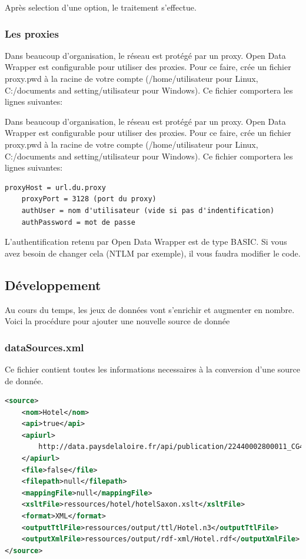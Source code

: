 \documentclass[a4paper]{article}
\begin{document}
Après selection d'une option, le traitement s'effectue.

\subsubsection{Les proxies}

Dans beaucoup d'organisation, le réseau est protégé par un proxy. Open Data
Wrapper est configurable pour utiliser des proxies. Pour ce faire, crée un
fichier proxy.pwd à la racine de votre compte (/home/utilisateur pour Linux,
C:/documents and setting/utilisateur pour Windows). Ce fichier comportera les
lignes suivantes:

Dans beaucoup d'organisation, le réseau est protégé par un proxy. Open Data
Wrapper est configurable pour utiliser des proxies. Pour ce faire, crée un
fichier proxy.pwd à la racine de votre compte (/home/utilisateur pour Linux,
C:/documents and setting/utilisateur pour Windows). Ce fichier comportera les
lignes suivantes:

\begin{lstlisting}[caption=Fichier de configuration des proxys proxy.pwd]
	proxyHost = url.du.proxy
	proxyPort = 3128 (port du proxy)
	authUser = nom d'utilisateur (vide si pas d'indentification)
	authPassword = mot de passe
\end{lstlisting}

L'authentification retenu par Open Data Wrapper est de type BASIC. Si vous avez
besoin de changer cela (NTLM par exemple), il vous faudra modifier le code.

\subsection{Développement}

Au cours du temps, les jeux de données vont s'enrichir et augmenter en nombre.
Voici la procédure pour ajouter une nouvelle source de donnée

\subsubsection{dataSources.xml}

Ce fichier contient toutes les informations necessaires à la conversion d'une
source de donnée.

\begin{lstlisting}[caption=Extrait de dataSources.xml, language=XML]
<source>
	<nom>Hotel</nom>
	<api>true</api>
	<apiurl>
		http://data.paysdelaloire.fr/api/publication/22440002800011_CG44_TOU_04815/hotels_STBL/content?format=xml
	</apiurl>
	<file>false</file>
	<filepath>null</filepath>
	<mappingFile>null</mappingFile>
	<xsltFile>ressources/hotel/hotelSaxon.xslt</xsltFile>
	<format>XML</format>
	<outputTtlFile>ressources/output/ttl/Hotel.n3</outputTtlFile>
	<outputXmlFile>ressources/output/rdf-xml/Hotel.rdf</outputXmlFile>
</source>
\end{lstlisting}
\end{document}
